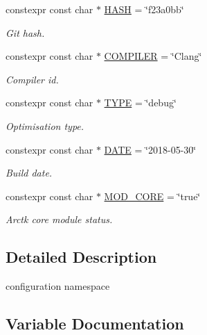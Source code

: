 \begin{DoxyCompactItemize}
constexpr const char $\ast$ \mbox{\hyperlink{namespacearc_1_1config_acba74c1165508123cf039684296dd007}{H\+A\+SH}} = \char`\"{}f23a0bb\char`\"{}
\begin{DoxyCompactList}\small\item\em Git hash. \end{DoxyCompactList}\item 
constexpr const char $\ast$ \mbox{\hyperlink{namespacearc_1_1config_abfeebd457f762473ba01e07e14c8d084}{C\+O\+M\+P\+I\+L\+ER}} = \char`\"{}Clang\char`\"{}
\begin{DoxyCompactList}\small\item\em Compiler id. \end{DoxyCompactList}\item 
constexpr const char $\ast$ \mbox{\hyperlink{namespacearc_1_1config_ad6eeea3db680c98dc954b7951924fb0b}{T\+Y\+PE}} = \char`\"{}debug\char`\"{}
\begin{DoxyCompactList}\small\item\em Optimisation type. \end{DoxyCompactList}\item 
constexpr const char $\ast$ \mbox{\hyperlink{namespacearc_1_1config_aa60520859e13bbee2fb47d352d337c87}{D\+A\+TE}} = \char`\"{}2018-\/05-\/30\char`\"{}
\begin{DoxyCompactList}\small\item\em Build date. \end{DoxyCompactList}\item 
constexpr const char $\ast$ \mbox{\hyperlink{namespacearc_1_1config_a91b9e1afbcd188b61eb1430caeac30db}{M\+O\+D\+\_\+\+C\+O\+RE}} = \char`\"{}true\char`\"{}
\begin{DoxyCompactList}\small\item\em Arctk core module status. \end{DoxyCompactList}\end{DoxyCompactItemize}


\subsection{Detailed Description}
configuration namespace 

\subsection{Variable Documentation}
\mbox{\label{namespacearc_1_1config_ad3826980a7fae51393802afb8fdcc382}} 
